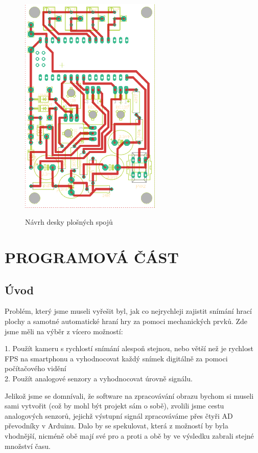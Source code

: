 \documentclass[12pt,oneside]{book} %
\begin{document}
\begin{figure}[ht] \large\centering
\includegraphics[width=0.60\textwidth]{./img/pcb.png}\\[1cm] 
\caption{Návrh desky plošných spojů}
\label{pcb}
\end{figure} 
\part{PROGRAMOVÁ ČÁST}\label{program}

\chapter{Úvod}\label{progRes}
\qquad Problém, který jsme museli vyřešit byl, jak co nejrychleji zajistit snímání hrací plochy a samotné automatické hraní hry za pomoci mechanických prvků. Zde jsme měli na výběr z vícero možností: \par  1. Použít kameru s rychlostí snímání alespoň stejnou, nebo větší než je rychlost FPS na smartphonu a vyhodnocovat každý snímek digitálně za pomoci počítačového vidění \\
2. Použít analogové senzory a vyhodnocovat úrovně signálu.\par
\qquad Jelikož jsme se domnívali, že software na zpracovávání obrazu bychom si museli sami vytvořit (což by mohl být projekt sám o sobě), zvolili jsme cestu analogových senzorů, jejichž výstupní signál zpracováváme přes čtyři AD převodníky v Arduinu. Dalo by se spekulovat, která z možností by byla vhodnější, nicméně obě mají své pro a proti a obě by ve výsledku zabrali stejné množství času.
\end{document}
